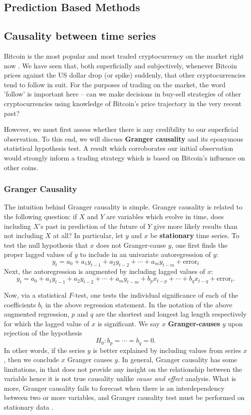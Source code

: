 \documentclass[twoside]{report}
\begin{document}
\begin{spacing}{1}
\chapter{Prediction Based Methods}
\section{Causality between time series}
Bitcoin is the most popular and most traded cryptocurrency on the market right now \cite{popularCryptos}. We have seen that, both superficially and subjectively, whenever Bitcoin prices against the US dollar drop (or spike) suddenly, that other cryptocurrencies tend to follow in suit. For the purposes of trading on the market, the word 'follow' is important here -- can we make decisions in buy-sell strategies of other cryptocurrencies using knowledge of Bitcoin's price trajectory in the very recent past? 

However, we must first assess whether there is any credibility to our superficial observation. To this end, we will discuss \textbf{Granger causality} and its eponymous statistical hypothesis test. A result which corroborates our initial observation would strongly inform a trading strategy which is based on Bitcoin's influence on other coins. 
\subsection{Granger Causality}
The intuition behind Granger causality is simple. Granger causality is related to the following question: if $X$ and $Y$ are variables which evolve in time, does including $X$'s past in prediction of the future of $Y$ give more likely results than not including $X$ at all? In particular, let $y$ and $x$ be \textbf{stationary} time series. To test the null hypothesis that $x$ does not Granger-cause $y$, one first finds the proper lagged values of $y$ to include in an univariate autoregression of $y$:
\[y_t = a_0 + a_1y_{t-1} + a_2y_{t-2} + \cdots + a_my_{t-m} + \text{error}_t\]
Next, the autoregression is augmented by including lagged values of $x$:
\[y_t = a_0 + a_1y_{t-1} + a_2y_{t-2} + \cdots + a_my_{t-m} + b_px_{t-p} + \cdots + b_qx_{t-q} + \text{error}_t.\]

Now, via a statistical $F$-test, one tests the individual significance of each of the coefficients $b_i$ in the above regression statement. In the notation of the above augmented regression, $p$ and $q$ are the shortest and longest lag length respectively for which the lagged value of $x$ is significant. We say $x$ \textbf{Granger-causes} $y$ upon rejection of the hypothesis \[
H_0: b_p = \cdots = b_q = 0. 
\]
In other words, if the series $y$ is better explained by including values from series $x$, then we conclude $x$ Granger causes $y$. 
In general, Granger causality has some limitations, in that does not provide any insight on the relationship between the variable hence it is not true causality unlike \textit{cause and effect} analysis. What is more, Granger causality fails to forecast when there is an interdependency between two or more variables, and Granger causality test must be performed on stationary data \cite{GrangerCausality}.


\end{spacing}
\end{document}
